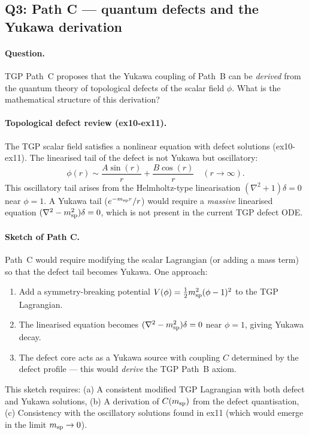 \subsection{Q3: Path C — quantum defects and the Yukawa derivation}
\label{sec:path_c}

\paragraph{Question.}
TGP Path~C proposes that the Yukawa coupling of Path~B can be
\emph{derived} from the quantum theory of topological defects of the
scalar field $\phi$.  What is the mathematical structure of this
derivation?

\paragraph{Topological defect review (ex10-ex11).}
The TGP scalar field satisfies a nonlinear equation with defect solutions
(ex10-ex11).  The linearised tail of the defect is not Yukawa but
oscillatory:
\begin{equation}
  \phi(r)\sim\frac{A\sin(r)}{r} + \frac{B\cos(r)}{r}\quad
  (r\to\infty).
\end{equation}
This oscillatory tail arises from the Helmholtz-type linearisation
$(\nabla^2+1)\delta=0$ near $\phi=1$.  A Yukawa tail
($e^{-m_{\rm sp}r}/r$) would require a \emph{massive} linearised
equation $(\nabla^2-m_{\rm sp}^2)\delta=0$, which is not present
in the current TGP defect ODE.

\paragraph{Sketch of Path C.}
Path~C would require modifying the scalar Lagrangian (or adding
a mass term) so that the defect tail becomes Yukawa.  One approach:
\begin{enumerate}
\item Add a symmetry-breaking potential $V(\phi)=\frac{1}{2}m_{\rm sp}^2(\phi-1)^2$
  to the TGP Lagrangian.
\item The linearised equation becomes $(\nabla^2-m_{\rm sp}^2)\delta=0$
  near $\phi=1$, giving Yukawa decay.
\item The defect core acts as a Yukawa source with coupling $C$
  determined by the defect profile — this would \emph{derive}
  the TGP Path~B axiom.
\end{enumerate}
This sketch requires:
(a) A consistent modified TGP Lagrangian with both defect and Yukawa solutions,
(b) A derivation of $C(m_{\rm sp})$ from the defect quantisation,
(c) Consistency with the oscillatory solutions found in ex11
  (which would emerge in the limit $m_{\rm sp}\to0$).

